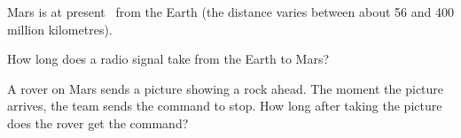 Mars is at present \dO\ from the Earth (the distance varies between about 56 and 400 million kilometres).

\begin{abcliste}
\abc How long does a radio signal take from the Earth to Mars?

\abc A rover on Mars sends a picture showing a rock ahead. The moment the picture arrives, the team sends the command to stop. How long after taking the picture does the rover get the command?
\end{abcliste}
